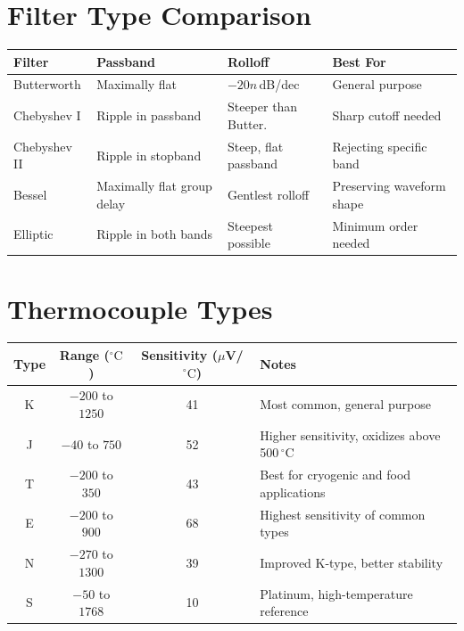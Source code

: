 \documentclass[11pt,letterpaper,twoside,openany]{book}
\newcommand{\degC}{\ensuremath{{}^{\circ}\text{C}}}
\begin{document}
\section*{Filter Type Comparison}
\begin{center}
\begin{tabular}{p{2.5cm}p{3cm}p{3cm}p{3.5cm}}
\toprule
\textbf{Filter} & \textbf{Passband} & \textbf{Rolloff} & \textbf{Best For} \\
\midrule
Butterworth & Maximally flat & $-20n$\,dB/dec & General purpose \\
Chebyshev I & Ripple in passband & Steeper than Butter. & Sharp cutoff needed \\
Chebyshev II & Ripple in stopband & Steep, flat passband & Rejecting specific band \\
Bessel & Maximally flat group delay & Gentlest rolloff & Preserving waveform shape \\
Elliptic & Ripple in both bands & Steepest possible & Minimum order needed \\
\bottomrule
\end{tabular}
\end{center}

\section*{Thermocouple Types}
\begin{center}
\begin{tabular}{cccl}
\toprule
\textbf{Type} & \textbf{Range (\degC)} & \textbf{Sensitivity ($\mu$V/\degC)} & \textbf{Notes} \\
\midrule
K & $-200$ to $1250$ & 41 & Most common, general purpose \\
J & $-40$ to $750$ & 52 & Higher sensitivity, oxidizes above 500\,\degC \\
T & $-200$ to $350$ & 43 & Best for cryogenic and food applications \\
E & $-200$ to $900$ & 68 & Highest sensitivity of common types \\
N & $-270$ to $1300$ & 39 & Improved K-type, better stability \\
S & $-50$ to $1768$ & 10 & Platinum, high-temperature reference \\
\bottomrule
\end{tabular}
\end{center}
\end{document}
